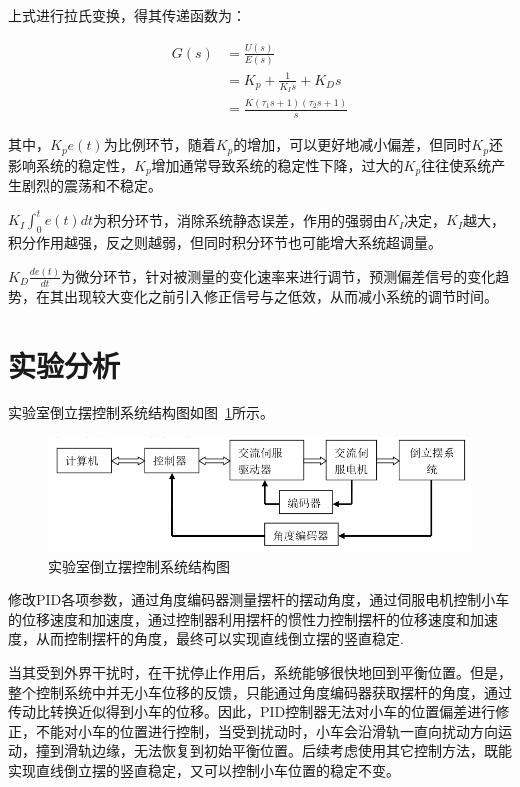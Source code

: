 上式进行拉氏变换，得其传递函数为：

\begin{equation}
\begin{aligned}
G(s)&=\frac{U(s)}{E(s)}\\
&=K_p+\frac{1}{K_Is}+K_Ds\\
&=\frac{K(\tau_1s+1)(\tau_2s+1)}{s}
\end{aligned}
\end{equation}

其中，$K_pe(t)$为比例环节，随着$K_p$的增加，可以更好地减小偏差，但同时$K_p$还影响系统的稳定性，$K_p$增加通常导致系统的稳定性下降，过大的$K_p$往往使系统产生剧烈的震荡和不稳定。

$K_I\int_0^te(t)dt$为积分环节，消除系统静态误差，作用的强弱由$K_I$决定，$K_I$越大，积分作用越强，反之则越弱，但同时积分环节也可能增大系统超调量。

$K_D\frac{de(t)}{dt}$为微分环节，针对被测量的变化速率来进行调节，预测偏差信号的变化趋势，在其出现较大变化之前引入修正信号与之低效，从而减小系统的调节时间。

\section{实验分析}

实验室倒立摆控制系统结构图如图~\ref{fig:structure}所示。

\begin{figure}[hbpt]
\centering
\includegraphics[width=12cm]{structure.png}
\caption{实验室倒立摆控制系统结构图}\label{fig:structure}
\end{figure}

修改PID各项参数，通过角度编码器测量摆杆的摆动角度，通过伺服电机控制小车的位移速度和加速度，通过控制器利用摆杆的惯性力控制摆杆的位移速度和加速度，从而控制摆杆的角度，最终可以实现直线倒立摆的竖直稳定.

当其受到外界干扰时，在干扰停止作用后，系统能够很快地回到平衡位置。但是，整个控制系统中并无小车位移的反馈，只能通过角度编码器获取摆杆的角度，通过传动比转换近似得到小车的位移。因此，PID控制器无法对小车的位置偏差进行修正，不能对小车的位置进行控制，当受到扰动时，小车会沿滑轨一直向扰动方向运动，撞到滑轨边缘，无法恢复到初始平衡位置。后续考虑使用其它控制方法，既能实现直线倒立摆的竖直稳定，又可以控制小车位置的稳定不变。

